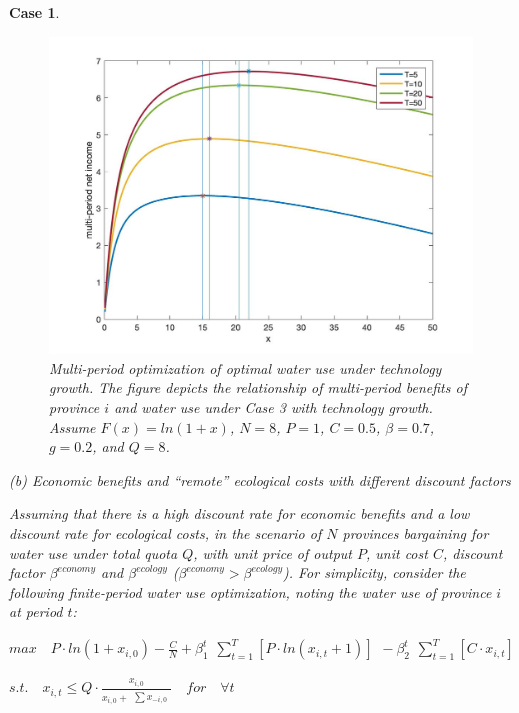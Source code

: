 \documentclass[default, sn-standardnature]{sn-jnl} %
\newtheorem{case_appendix}{Case}
\begin{document}
\begin{case_appendix}
\begin{figure}[H]
    \centering
    \includegraphics[width=0.9\linewidth]{outputs/Fig3.jpg}
    \caption{Multi-period optimization of optimal water use under technology growth. The figure depicts the relationship of multi-period benefits of province $i$ and water use under Case 3 with technology growth. Assume $F(x)=ln(1+x)$, $N=8$, $P=1$, $C=0.5$, $\beta=0.7$, $g=0.2$, and $Q=8$.}
    \label{fig:technology}
\end{figure}

(b) Economic benefits and ``remote'' ecological costs with different discount factors

Assuming that there is a high discount rate for economic benefits and a low discount rate for ecological costs, in the scenario of $N$ provinces bargaining for water use under total quota $Q$, with unit price of output $P$, unit cost $C$, discount factor $\beta^{economy}$ and $\beta^{ecology}$ ($\beta^{economy} > \beta^{ecology}$). For simplicity, consider the following finite-period water use optimization, noting the water use of province $i$ at period $t$:

$ max \quad P \cdot ln(1+x_{i,0})-\frac{C}{N}+\beta_1^t \begin{matrix} \sum_{t=1}^T [P \cdot ln(x_{i,t}+1)]  \end{matrix} - \beta_2^t \begin{matrix} \sum_{t=1}^T [C \cdot x_{i,t}] \end{matrix}$

$s.t. \quad x_{i,t} \leq Q \cdot \frac{x_{i,0}}{x_{i,0} + \begin{matrix} \sum x_{-i,0} \end{matrix}} \quad for \quad \forall t$


\end{case_appendix}
\end{document}
